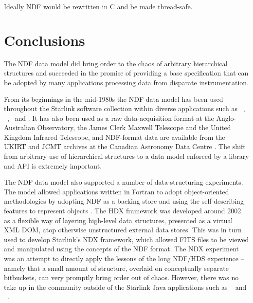 \documentclass[final,authoryear,5p,times,twocolumn]{elsarticle}
\begin{document}
Ideally NDF would be rewritten in C and be made thread-safe.

\section{Conclusions}
\label{sec:conclusion}

The NDF data model did bring order to the chaos of arbitrary
hierarchical structures and succeeded in the
promise of providing a base specification that can be adopted by many
applications processing data from disparate instrumentation.

From its beginnings in the mid-1980s the NDF data model has been used
throughout the Starlink software collection within diverse
applications such as \smurf\ \citep{2013MNRAS.430.2545C},
\ccdpack\ \citep{1993ESOC...47...39W,SUN139}, \gaia\ and \KAPPA.
It has also been used as a raw data-acquisition format at the
Anglo-Australian Observatory, the James Clerk Maxwell Telescope and the United Kingdom Infrared
Telescope, and NDF-format data are available from
the UKIRT and JCMT archives at the Canadian Astronomy Data Centre
\citep{2008ASPC..394..450E,P01_adassxxiii}. The shift from arbitrary
use of hierarchical structures to a data model enforced by a library
and API is extremely important.

The NDF data model also supported a number of data-structuring
experiments.
The model allowed applications written in Fortran to
adopt object-oriented methodologies by adopting NDF as a backing store
and using the self-describing features to represent objects
\citep{1993ASPC...52..199B}.
The HDX framework \citep{2003ASPC..295..221G} was developed around 2002 as a flexible
way of layering high-level data structures, presented as a virtual XML
DOM, atop otherwise unstructured external data stores.  This was in
turn used to develop Starlink's NDX framework,\label{sec:ndx} which allowed FITS
files to be viewed and manipulated using the concepts of the NDF
format.  The NDX experiment was an attempt to directly apply the
lessons of the long NDF/HDS experience -- namely that a small amount of
structure, overlaid on conceptually separate bitbuckets, can very
promptly bring order out of chaos.
However, there was no take up in the community outside of the Starlink Java applications
such as \treeview\ \citep{2003ASPC..295..445B} and
\splat\ \citep[][]{2005ASPC..347...22D}.
\end{document}
